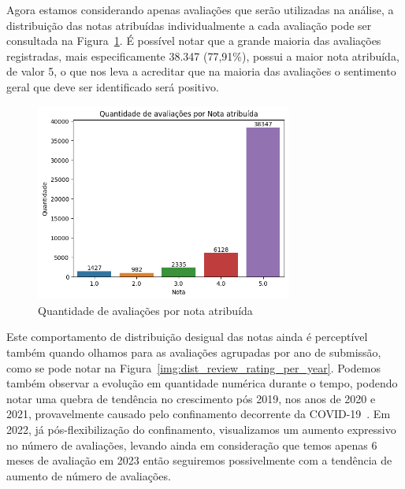 Agora estamos considerando apenas avaliações que serão utilizadas na análise, a distribuição das notas atribuídas individualmente a cada avaliação pode ser consultada na Figura~\ref{img:dist_review_rating}. É possível notar que a grande maioria das avaliações registradas, mais especificamente 38.347 (77,91\%), possui a maior nota atribuída, de valor 5, o que nos leva a acreditar que na maioria das avaliações o sentimento geral que deve ser identificado será positivo.

\begin{figure}
	\centering
	\includegraphics[width=0.75\textwidth]{figs/exploratoria/quantidade_avaliacao_nota_atribuida.png}
	\caption{Quantidade de avaliações por nota atribuída}
	\label{img:dist_review_rating}
\end{figure}

Este comportamento de distribuição desigual das notas ainda é perceptível também quando olhamos para as avaliações agrupadas por ano de submissão, como se pode notar na Figura~\ref{img:dist_review_rating_per_year}. Podemos também observar a evolução em quantidade numérica durante o tempo, podendo notar uma quebra de tendência no crescimento pós 2019, nos anos de 2020 e 2021, provavelmente causado pelo confinamento decorrente da COVID-19~\cite{Guardia2022}. Em 2022, já pós-flexibilização do confinamento, visualizamos um aumento expressivo no número de avaliações, levando ainda em consideração que temos apenas 6 meses de avaliação em 2023 então seguiremos possivelmente com a tendência de aumento de número de avaliações.

